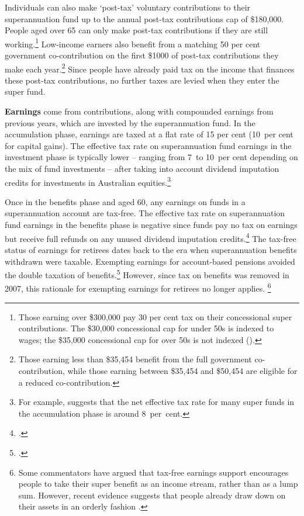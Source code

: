 Individuals can also make ‘post-tax’ voluntary contributions to their superannuation fund up to the annual post-tax contributions cap of \$180,000.  People aged over 65 can only make post-tax contributions if they are still working.\footnote{Those earning over \$300,000 pay 30 per cent tax on their concessional super contributions. The \$30,000 concessional cap for under 50s is indexed to wages; the \$35,000 concessional cap for over 50s is not indexed (\textcite{ATO2015ConcessionalContrCap}).}  Low-income earners also benefit from a matching 50 per cent government co-contribution on the first \$1000 of post-tax contributions they make each year.\footnote{\textcites{ATO2015SuperCoContr}{ATO2015IncomeThresholdTest} Those earning less than \$35,454 benefit from the full government co-contribution, while those earning between \$35,454 and \$50,454 are eligible for a reduced co-contribution.} Since people have already paid tax on the income that finances these post-tax contributions, no further taxes are levied when they enter the super fund.

\textbf{Earnings} come from contributions, along with compounded earnings from previous years, which are invested by the superannuation fund. In the accumulation phase, earnings are taxed at a flat rate of 15 per cent (10~per cent for capital gains). The effective tax rate on superannuation fund earnings in the investment phase is typically lower – ranging from 7~to 10~per cent depending on the mix of fund investments – after taking into account dividend imputation credits for investments in Australian equities.\footnote{For example, \textcite[][39]{Mercer2015GlobalPensionIndex}  suggests that the net effective tax rate for many super funds in the accumulation phase is around 8~per~cent.}

Once in the benefits phase and aged 60, any earnings on funds in a superannuation account are tax-free. The effective tax rate on superannuation fund earnings in the benefits phase is negative since funds pay no tax on earnings but receive full refunds on any unused dividend imputation credits.\footcites{ATO2015RefundingImputationCredits}[][Appendix~B]{FinancialSystemsInquiry2015} The tax-free status of earnings for retirees dates back to the era when superannuation benefits withdrawn were taxable. Exempting earnings for account-based pensions avoided the double taxation of benefits.\footcite{HenryTaxReview2010} However, since tax on benefits was removed in 2007, this rationale for exempting earnings for retirees no longer applies.%
\footnote{Some commentators have argued that tax-free earnings support encourages people to take their super benefit as an income stream, rather than as a lump sum. However, recent evidence suggests that people already draw down on their assets in an orderly fashion \textcite[][16]{ProductivityCommission2015SuperPolicyPostRetirement}.} 

